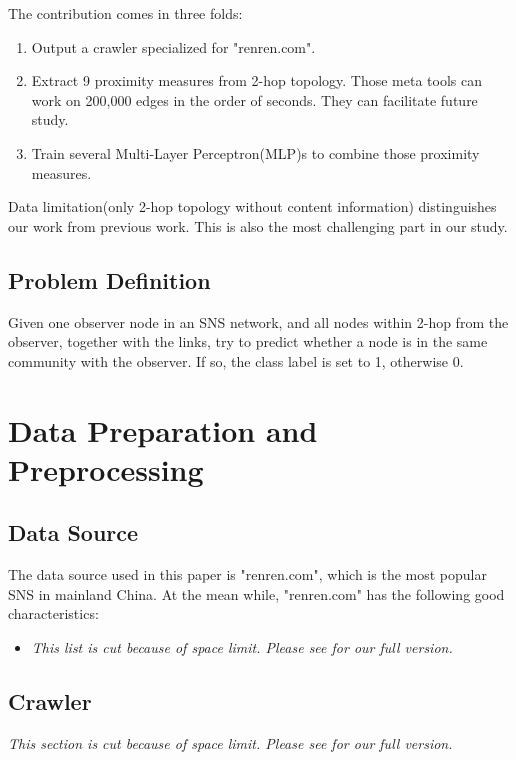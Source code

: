 \documentclass[11pt,a4paper]{article}
\begin{document}
The contribution comes in three folds:
\begin{enumerate}
	\item Output a crawler specialized for "renren.com". 
	\item Extract 9 proximity measures from 2-hop topology. 
	Those meta tools can work on 200,000 edges in the order 
	of seconds. They can facilitate future study. 
	\item Train several Multi-Layer Perceptron(MLP)s to 
	combine those proximity measures. 
\end{enumerate}

Data limitation(only 2-hop topology without content information)
distinguishes our work from previous work. This is also 
the most challenging part in our study. 

\subsection{Problem Definition}

Given one observer node in an SNS network, and 
all nodes within 2-hop from the observer, together 
with the links, try to predict whether a node is 
in the same community with the observer. If so, 
the class label is set to 1, otherwise 0. 

\section{Data Preparation and Preprocessing}

\subsection{Data Source}

The data source used in this paper is "renren.com", which is the 
most popular SNS in mainland China. At the mean while, "renren.com" 
has the following good characteristics:
\begin{itemize}
	\item \textit{This list is cut because of space limit. Please see \cite{hu2011-cd2hop}
for our full version.  }
\end{itemize}

\subsection{Crawler}

\textit{This section is cut because of space limit. Please see \cite{hu2011-cd2hop}
for our full version. }
\end{document}
